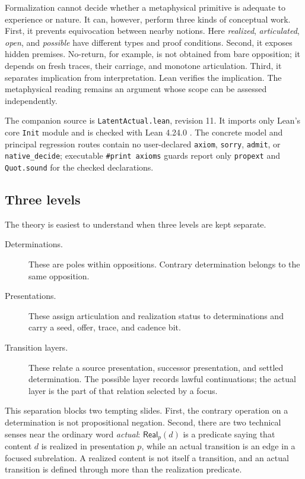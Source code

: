 \documentclass[11pt]{article}
\theoremstyle{definition}
\theoremstyle{remark}
\newcommand{\lean}[1]{\nolinkurl{#1}}
\newcommand{\Real}{\mathsf{Real}}
\begin{document}
Formalization cannot decide whether a metaphysical primitive is adequate to
experience or nature. It can, however, perform three kinds of conceptual work.
First, it prevents equivocation between nearby notions. Here
\emph{realized}, \emph{articulated}, \emph{open}, and \emph{possible} have
different types and proof conditions. Second, it exposes hidden premises.
No-return, for example, is not obtained from bare opposition; it depends on
fresh traces, their carriage, and monotone articulation. Third, it separates
implication from interpretation. Lean verifies the implication. The
metaphysical reading remains an argument whose scope can be assessed
independently.

The companion source is \lean{LatentActual.lean}, revision 11. It imports only
Lean's core \lean{Init} module and is checked with Lean 4.24.0
\cite{deMouraUllrich2021}. The concrete
model and principal regression routes contain no user-declared
\lean{axiom}, \lean{sorry}, \lean{admit}, or \lean{native_decide}; executable
\texttt{\#print axioms} guards report only \lean{propext} and
\lean{Quot.sound} for
the checked declarations.

\subsection{Three levels}

The theory is easiest to understand when three levels are kept separate.

\begin{description}
  \item[Determinations.]
  These are poles within oppositions. Contrary determination belongs to the
  same opposition.

  \item[Presentations.]
  These assign articulation and realization status to determinations and carry
  a seed, offer, trace, and cadence bit.

  \item[Transition layers.]
  These relate a source presentation, successor presentation, and settled
  determination. The possible layer records lawful continuations; the actual
  layer is the part of that relation selected by a focus.
\end{description}

This separation blocks two tempting slides. First, the contrary operation on a
determination is not propositional negation. Second, there are two technical
senses near the ordinary word \emph{actual}: \(\Real_p(d)\) is a predicate
saying that content \(d\) is realized in presentation \(p\), while an actual
transition is an edge in a focused subrelation. A realized content is not
itself a transition, and an actual transition is defined through more than the
realization predicate.
\end{document}
